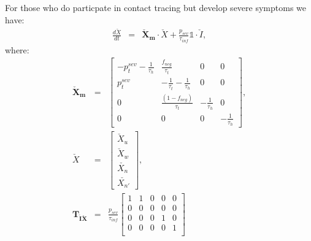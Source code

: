 \documentclass[notitlepage, superscriptaddress]{revtex4-2}
\begin{document}
For those who do particpate in contact tracing but develop severe symptoms we have:
\begin{eqnarray}
\frac{d\check{X}}{dt} &=& \boldsymbol{\check{X}_{m}} \cdot  \check{X} + \frac{p_{sev}}{\tau_{inf}} \mathbb{1} \cdot  \check{I}, 
\end{eqnarray}
where:
%
\begin{eqnarray}
\boldsymbol{\check{X}_{m}} &=&
\begin{bmatrix}
- p^{sev}_{t}   - \frac{1}{\tau_{h}}      &  \frac{f_{neg}}{\tau_{t}}    & 0  & 0\\
p^{sev}_{t}                  &  -\frac{1}{\tau_{t}}  - \frac{1}{\tau_{h}}  & 0 & 0\\
0 & \frac{(1-f_{neg})}{\tau_{t}}  &  -  \frac{1}{\tau_{h}} & 0 \\ 
0 & 0 & 0 &  -  \frac{1}{\tau_{h}}
\end{bmatrix}, \\ 
%
\check{X} &=& 
\begin{bmatrix}
\check{X}_{u} \\  \check{X}_{w}\\ \check{X_{n}} \\ \check{X_{n'}}
\end{bmatrix}, \\ 
%
\boldsymbol{T_{\check{I}\check{X}}} &=& \frac{p_{sev}}{\tau_{inf}}
\begin{bmatrix}
1  & 1 & 0 & 0 & 0 \\ 
0  & 0 & 0 & 0 & 0 \\ 
0  & 0 & 0 & 1 & 0 \\ 
0  & 0 & 0 & 0 & 1 \\ 
\end{bmatrix}
\end{eqnarray}
\end{document}
